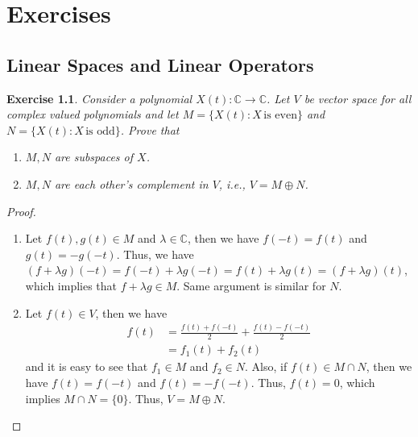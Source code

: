 \documentclass[11pt]{book}
\newtheorem{exercise}{Exercise}[section]
\theoremstyle{definition}
\numberwithin{equation}{subsection}
\begin{document}
\chapter{Exercises}

\section{Linear Spaces and Linear Operators}
\begin{exercise}\label{ex_1}
Consider a polynomial $X(t):\mathbb{C}\to\mathbb{C}$. Let $V$ be vector space for all complex valued polynomials and let $M = \{X(t): X \,\text{is even}\}$ and $N = \{X(t): X \,\text{is odd}\}$. Prove that 
\begin{enumerate}[label=(\alph*)]
    \item $M,N$ are subspaces of $X$.
    \item $M, N$ are each other's complement in $V$, i.e., $V = M\oplus N$.
\end{enumerate}
\end{exercise}
\begin{proof}
~\begin{enumerate}[label=(\alph*)]
    \item Let $f(t), g(t)\in M$ and $\lambda\in\mathbb{C}$, then we have $f(-t) = f(t)$ and $g(t) = -g(-t)$. Thus, we have $(f+\lambda g)(-t) = f(-t) + \lambda g(-t) = f(t) + \lambda g(t) = (f+\lambda g)(t)$, which implies that $f+\lambda g\in M$. Same argument is similar for $N$.
    \item Let $f(t)\in V$, then we have 
    \begin{align*}
        f(t) & = \frac{f(t) + f(-t)}{2} + \frac{f(t) - f(-t)}{2} \\
        & = f_1(t) + f_2(t)
    \end{align*}
    and it is easy to see that $f_1\in M$ and $f_2\in N$. Also, if $f(t)\in M\cap N$, then we have $f(t) = f(-t)$ and $f(t) = -f(-t)$. Thus, $f(t) = 0$, which implies $M\cap N = \{0\}$. Thus, $V = M\oplus N$.
\end{enumerate}
\end{proof}

\medskip
\end{document}
